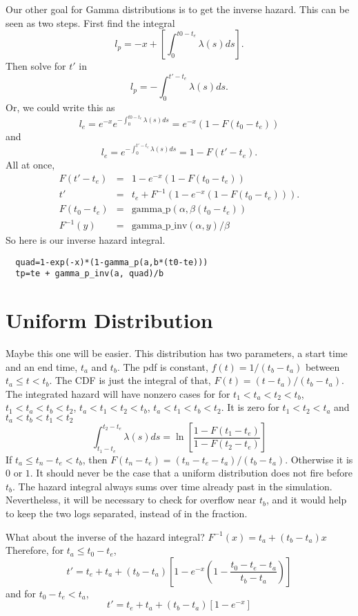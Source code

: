 \documentclass{article}
\begin{document}
Our other goal for Gamma distributions is to get the inverse hazard.
This can be seen as two steps. First find the integral
\begin{equation}
  l_p=-x+\left[\int_0^{t0-t_e}\lambda(s)ds\right].
\end{equation}
Then solve for $t'$ in
\begin{equation}
  l_p=-\int_0^{t'-t_e}\lambda(s)ds.
\end{equation}
Or, we could write this as
\begin{equation}
  l_e =e^{-x}e^{-\int_0^{t0-t_e}\lambda(s)ds}=e^{-x}(1-F(t_0-t_e))
\end{equation}
and
\begin{equation}
  l_e=e^{-\int_0^{t'-t_e}\lambda(s)ds}=1-F(t'-t_e).
\end{equation}
All at once,
\begin{eqnarray}
  F(t'-t_e)&=&1-e^{-x}(1-F(t_0-t_e)) \\
 t'&=&t_e+F^{-1}\left(1-e^{-x}(1-F(t_0-t_e))\right). \\
 F(t_0-t_e)&=&\mbox{gamma\_p}(\alpha,\beta(t_0-t_e)) \\
 F^{-1}(y)&=&\mbox{gamma\_p\_inv}(\alpha, y)/\beta
\end{eqnarray}
So here is our inverse hazard integral.
\begin{lstlisting}
  quad=1-exp(-x)*(1-gamma_p(a,b*(t0-te)))
  tp=te + gamma_p_inv(a, quad)/b
\end{lstlisting}

\section{Uniform Distribution}
Maybe this one will be easier.
This distribution has two parameters, a start time
and an end time, $t_a$ and $t_b$.
The pdf is constant, $f(t)=1/(t_b-t_a)$ between
$t_a\le t<t_b$. The CDF is just the integral of
that, $F(t)=(t-t_a)/(t_b-t_a)$.
The integrated hazard will have nonzero cases for
for $t_1<t_a<t_2<t_b$, $t_1<t_a<t_b<t_2$,
$t_a<t_1<t_2<t_b$, $t_a<t_1<t_b<t_2$.
It is zero for $t_1<t_2<t_a$ and $t_a<t_b<t_1<t_2$
\begin{equation}
  \int_{t_1-t_e}^{t_2-t_e}\lambda(s)ds=
      \ln\left[\frac{1-F(t_1-t_e)}{1-F(t_2-t_e)}\right]
\end{equation}
If $t_a\le t_n-t_e<t_b$, then $F(t_n-t_e)=(t_n-t_e-t_a)/(t_b-t_a)$.
Otherwise it is $0$ or $1$. It should never be the
case that a uniform distribution does not fire
before $t_b$. The hazard integral always sums over
time already past in the simulation. Nevertheless, it will
be necessary to check for overflow near $t_b$, and it
would help to keep the two logs separated, instead of
in the fraction.

What about the inverse of the hazard integral?
$F^{-1}(x)=t_a+(t_b-t_a)x$ Therefore, for $t_a\le t_0-t_e$,
\begin{equation}
  t'=t_e+t_a+(t_b-t_a)\left[1-e^{-x}\left(1-\frac{t_0-t_e-t_a}{t_b-t_a}\right)\right]
\end{equation}
and for $t_0-t_e< t_a$,
\begin{equation}
  t'=t_e+t_a+(t_b-t_a)\left[1-e^{-x}\right]
\end{equation}
\end{document}
